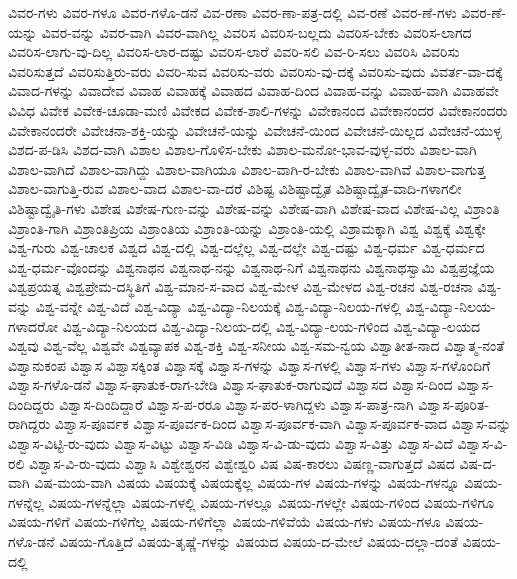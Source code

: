 {ವಿವರ-ಗಳು
ವಿವರ-ಗಳೂ
ವಿವರ-ಗಳೊ-ಡನೆ
ವಿವ-ರಣಾ
ವಿವರ-ಣಾ-ಪತ್ರ-ದಲ್ಲಿ
ವಿವ-ರಣೆ
ವಿವರ-ಣೆ-ಗಳು
ವಿವರ-ಣೆ-ಯನ್ನು
ವಿವರ-ವನ್ನು
ವಿವರ-ವಾಗಿ
ವಿವರ-ವಾಗಿಲ್ಲ
ವಿವರಿಸ
ವಿವರಿಸ-ಬಲ್ಲದು
ವಿವರಿಸ-ಬೇಕು
ವಿವರಿಸ-ಲಾಗದ
ವಿವರಿಸ-ಲಾಗು-ವು-ದಿಲ್ಲ
ವಿವರಿಸ-ಲಾರ-ದಷ್ಟು
ವಿವರಿಸ-ಲಾರೆ
ವಿವರಿ-ಸಲಿ
ವಿವ-ರಿ-ಸಲು
ವಿವರಿಸಿ
ವಿವರಿಸು
ವಿವರಿಸುತ್ತದೆ
ವಿವರಿಸುತ್ತಿರು-ವರು
ವಿವರಿ-ಸುವ
ವಿವರಿಸು-ವರು
ವಿವರಿಸು-ವು-ದಕ್ಕೆ
ವಿವರಿಸು-ವುದು
ವಿವರ್ತ-ವಾ-ದಕ್ಕೆ
ವಿವಾದ-ಗಳನ್ನು
ವಿವಾದೇವ
ವಿವಾಹ
ವಿವಾಹಕ್ಕೆ
ವಿವಾಹದ
ವಿವಾಹ-ದಿಂದ
ವಿವಾಹ-ವನ್ನು
ವಿವಾಹ-ವಾಗಿ
ವಿವಾಹವೇ
ವಿವಿಧ
ವಿವೇಕ
ವಿವೇಕ-ಚೂಡಾ-ಮಣಿ
ವಿವೇಕದ
ವಿವೇಕ-ಶಾಲಿ-ಗಳನ್ನು
ವಿವೇಕಾನಂದ
ವಿವೇಕಾನಂದರ
ವಿವೇಕಾನಂದರು
ವಿವೇಕಾನಂದರೇ
ವಿವೇಚನಾ-ಶಕ್ತಿ-ಯನ್ನು
ವಿವೇಚನೆ-ಯನ್ನು
ವಿವೇಚನೆ-ಯಿಂದ
ವಿವೇಚನೆ-ಯಿಲ್ಲದ
ವಿವೇಚನೆ-ಯುಳ್ಳ
ವಿಶದ-ಪ-ಡಿಸಿ
ವಿಶದ-ವಾಗಿ
ವಿಶಾಲ
ವಿಶಾಲ-ಗೊಳಿಸ-ಬೇಕು
ವಿಶಾಲ-ಮನೋ-ಭಾವ-ವುಳ್ಳ-ವರು
ವಿಶಾಲ-ವಾಗಿ
ವಿಶಾಲ-ವಾಗಿದೆ
ವಿಶಾಲ-ವಾಗಿದ್ದು
ವಿಶಾಲ-ವಾಗಿಯೂ
ವಿಶಾಲ-ವಾಗಿ-ರ-ಬೇಕು
ವಿಶಾಲ-ವಾಗಿವೆ
ವಿಶಾಲ-ವಾಗುತ್ತ
ವಿಶಾಲ-ವಾಗುತ್ತಿ-ರುವ
ವಿಶಾಲ-ವಾದ
ವಿಶಾಲ-ವಾ-ದರೆ
ವಿಶಿಷ್ಟ
ವಿಶಿಷ್ಟಾದ್ವೈತ
ವಿಶಿಷ್ಟಾದ್ವೈತ-ವಾದಿ-ಗಳಾಗಲೀ
ವಿಶಿಷ್ಟಾದ್ವೈತಿ-ಗಳು
ವಿಶೇಷ
ವಿಶೇಷ-ಗುಣ-ವನ್ನು
ವಿಶೇಷ-ವನ್ನು
ವಿಶೇಷ-ವಾಗಿ
ವಿಶೇಷ-ವಾದ
ವಿಶೇಷ-ವಿಲ್ಲ
ವಿಶ್ರಾಂತಿ
ವಿಶ್ರಾಂತಿ-ಗಾಗಿ
ವಿಶ್ರಾಂತಿಪ್ರಿಯ
ವಿಶ್ರಾಂತಿಯ
ವಿಶ್ರಾಂತಿ-ಯನ್ನು
ವಿಶ್ರಾಂತಿ-ಯಲ್ಲಿ
ವಿಶ್ರಾಮಕ್ಕಾಗಿ
ವಿಶ್ವ
ವಿಶ್ವಕ್ಕೆ
ವಿಶ್ವಕ್ಕೇ
ವಿಶ್ವ-ಗುರು
ವಿಶ್ವ-ಚಾಲಕ
ವಿಶ್ವದ
ವಿಶ್ವ-ದಲ್ಲಿ
ವಿಶ್ವ-ದಲ್ಲೆಲ್ಲ
ವಿಶ್ವ-ದಲ್ಲೇ
ವಿಶ್ವ-ದಷ್ಟು
ವಿಶ್ವ-ಧರ್ಮ
ವಿಶ್ವ-ಧರ್ಮದ
ವಿಶ್ವ-ಧರ್ಮ-ವೊಂದನ್ನು
ವಿಶ್ವನಾಥನ
ವಿಶ್ವನಾಥ-ನನ್ನು
ವಿಶ್ವನಾಥ-ನಿಗೆ
ವಿಶ್ವನಾಥನು
ವಿಶ್ವನಾಥಸ್ವಾಮಿ
ವಿಶ್ವಪ್ರಜ್ಞೆಯ
ವಿಶ್ವಪ್ರಯತ್ನ
ವಿಶ್ವಪ್ರೇಮ-ದಸ್ಥಿತಿಗೆ
ವಿಶ್ವ-ಮಾನ-ಸ-ವಾದ
ವಿಶ್ವ-ಮೇಳ
ವಿಶ್ವ-ಮೇಳದ
ವಿಶ್ವ-ರಚನ
ವಿಶ್ವ-ರಚನಾ
ವಿಶ್ವ-ವನ್ನು
ವಿಶ್ವ-ವನ್ನೇ
ವಿಶ್ವ-ವಿದೆ
ವಿಶ್ವ-ವಿದ್ಯಾ
ವಿಶ್ವ-ವಿದ್ಯಾ-ನಿಲಯಕ್ಕೆ
ವಿಶ್ವ-ವಿದ್ಯಾ-ನಿಲಯ-ಗಳಲ್ಲಿ
ವಿಶ್ವ-ವಿದ್ಯಾ-ನಿಲಯ-ಗಳಾದರೋ
ವಿಶ್ವ-ವಿದ್ಯಾ-ನಿಲಯದ
ವಿಶ್ವ-ವಿದ್ಯಾ-ನಿಲಯ-ದಲ್ಲಿ
ವಿಶ್ವ-ವಿದ್ಯಾ-ಲಯ-ಗಳಿಂದ
ವಿಶ್ವ-ವಿದ್ಯಾ-ಲಯದ
ವಿಶ್ವವು
ವಿಶ್ವ-ವೆಲ್ಲ
ವಿಶ್ವವೇ
ವಿಶ್ವವ್ಯಾಪಕ
ವಿಶ್ವ-ಶಕ್ತಿ
ವಿಶ್ವ-ಸನೀಯ
ವಿಶ್ವ-ಸಮ-ನ್ವಯ
ವಿಶ್ವಾತೀತ-ನಾದ
ವಿಶ್ವಾತ್ಮ-ನಂತೆ
ವಿಶ್ವಾನುಕಂಪ
ವಿಶ್ವಾಸ
ವಿಶ್ವಾಸಕ್ಕಿಂತ
ವಿಶ್ವಾಸಕ್ಕೆ
ವಿಶ್ವಾಸ-ಗಳನ್ನು
ವಿಶ್ವಾಸ-ಗಳಲ್ಲಿ
ವಿಶ್ವಾಸ-ಗಳು
ವಿಶ್ವಾಸ-ಗಳೊಂದಿಗೆ
ವಿಶ್ವಾಸ-ಗಳೊ-ಡನೆ
ವಿಶ್ವಾಸ-ಘಾತುಕ-ರಾಗ-ಬೇಡಿ
ವಿಶ್ವಾಸ-ಘಾತುಕ-ರಾಗುವುದೆ
ವಿಶ್ವಾಸದ
ವಿಶ್ವಾಸ-ದಿಂದ
ವಿಶ್ವಾಸ-ದಿಂದಿದ್ದರು
ವಿಶ್ವಾಸ-ದಿಂದಿದ್ದಾರೆ
ವಿಶ್ವಾಸ-ಪ-ರರೂ
ವಿಶ್ವಾಸ-ಪರ-ಳಾಗಿದ್ದಳು
ವಿಶ್ವಾಸ-ಪಾತ್ರ-ನಾಗಿ
ವಿಶ್ವಾಸ-ಪೂರಿತ-ರಾಗಿದ್ದರು
ವಿಶ್ವಾಸ-ಪೂರ್ವಕ
ವಿಶ್ವಾಸ-ಪೂರ್ವಕ-ದಿಂದ
ವಿಶ್ವಾಸ-ಪೂರ್ವಕ-ವಾಗಿ
ವಿಶ್ವಾಸ-ಪೂರ್ವಕ-ವಾದ
ವಿಶ್ವಾಸ-ವನ್ನು
ವಿಶ್ವಾಸ-ವಿಟ್ಟಿ-ರು-ವುದು
ವಿಶ್ವಾಸ-ವಿಟ್ಟು
ವಿಶ್ವಾಸ-ವಿಡಿ
ವಿಶ್ವಾಸ-ವಿ-ಡು-ವುದು
ವಿಶ್ವಾಸ-ವಿತ್ತು
ವಿಶ್ವಾಸ-ವಿದೆ
ವಿಶ್ವಾಸ-ವಿ-ರಲಿ
ವಿಶ್ವಾಸ-ವಿ-ರು-ವುದು
ವಿಶ್ವಾಸಿ
ವಿಶ್ವೇಶ್ವರನ
ವಿಶ್ವೇಶ್ವರಿ
ವಿಷ
ವಿಷ-ಕಾರಲು
ವಿಷಣ್ಣ-ವಾಗುತ್ತದೆ
ವಿಷದ
ವಿಷ-ದ-ವಾಗಿ
ವಿಷ-ಮಯ-ವಾಗಿ
ವಿಷಯ
ವಿಷಯಕ್ಕೆ
ವಿಷಯಕ್ಕೆಲ್ಲ
ವಿಷಯ-ಗಳ
ವಿಷಯ-ಗಳನ್ನು
ವಿಷಯ-ಗಳನ್ನೂ
ವಿಷಯ-ಗಳನ್ನೆಲ್ಲ
ವಿಷಯ-ಗಳನ್ನೆಲ್ಲಾ
ವಿಷಯ-ಗಳಲ್ಲಿ
ವಿಷಯ-ಗಳಲ್ಲೂ
ವಿಷಯ-ಗಳಲ್ಲೇ
ವಿಷಯ-ಗಳಿಂದ
ವಿಷಯ-ಗಳಿಗೂ
ವಿಷಯ-ಗಳಿಗೆ
ವಿಷಯ-ಗಳಿಗೆಲ್ಲ
ವಿಷಯ-ಗಳಿಗೆಲ್ಲಾ
ವಿಷಯ-ಗಳಿವೆಯೆ
ವಿಷಯ-ಗಳು
ವಿಷಯ-ಗಳೂ
ವಿಷಯ-ಗಳೊ-ಡನೆ
ವಿಷಯ-ಗೊತ್ತಿದೆ
ವಿಷಯ-ತೃಷ್ಣೆ-ಗಳನ್ನು
ವಿಷಯದ
ವಿಷಯ-ದ-ಮೇಲೆ
ವಿಷಯ-ದಲ್ಲಾ-ದಂತೆ
ವಿಷಯ-ದಲ್ಲಿ
}
